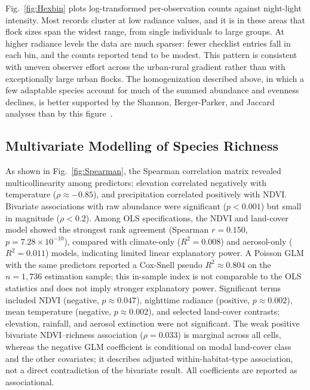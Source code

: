 \documentclass[conference]{IEEEtran}
\begin{document}
Fig.~\ref{fig:Hexbin} plots log-transformed per-observation counts against night-light intensity. Most records cluster at low radiance values, and it is in these areas that flock sizes span the widest range, from single individuals to large groups. At higher radiance levels the data are much sparser: fewer checklist entries fall in each bin, and the counts reported tend to be modest. This pattern is consistent with uneven observer effort across the urban-rural gradient rather than with exceptionally large urban flocks. The homogenization described above, in which a few adaptable species account for much of the summed abundance and evenness declines, is better supported by the Shannon, Berger-Parker, and Jaccard analyses than by this figure~\cite{ref15}.

\subsection{Multivariate Modelling of Species Richness}

As shown in Fig.~\ref{fig:Spearman}, the Spearman correlation matrix revealed multicollinearity among predictors: elevation correlated negatively with temperature ($\rho \approx -0.85$), and precipitation correlated positively with NDVI. Bivariate associations with raw abundance were significant ($p < 0.001$) but small in magnitude ($\rho < 0.2$). Among OLS specifications, the NDVI and land-cover model showed the strongest rank agreement (Spearman $r = 0.150$, $p = 7.28 \times 10^{-10}$), compared with climate-only ($R^2 = 0.008$) and aerosol-only ($R^2 = 0.011$) models, indicating limited linear explanatory power. A Poisson GLM with the same predictors reported a Cox-Snell pseudo $R^2 \approx 0.804$ on the $n = 1{,}736$ estimation sample; this in-sample index is not comparable to the OLS statistics and does not imply stronger explanatory power. Significant terms included NDVI (negative, $p \approx 0.047$), nighttime radiance (positive, $p \approx 0.002$), mean temperature (negative, $p \approx 0.002$), and selected land-cover contrasts; elevation, rainfall, and aerosol extinction were not significant. The weak positive bivariate NDVI--richness association ($\rho = 0.033$) is marginal across all cells, whereas the negative GLM coefficient is conditional on modal land-cover class and the other covariates; it describes adjusted within-habitat-type association, not a direct contradiction of the bivariate result. All coefficients are reported as associational.
\end{document}
